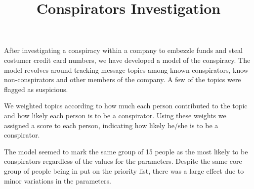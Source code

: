 \documentclass{icmmcm}
\title{Conspirators Investigation}
\begin{document}

\begin{summary}

After investigating a conspiracy within a company to embezzle funds and steal costumer credit card numbers, we have developed a model of the conspiracy.  The model revolves around tracking message topics among known conspirators, know non-conspirators and other members of the company.  A few of the topics were flagged as suspicious.

We weighted topics according to how much each person contributed to the topic and how likely each person is to be a conspirator.  Using these weights we assigned a score to each person, indicating how likely he/she is to be a conspirator. 

The model seemed to mark the same group of 15 people as the most likely to be conspirators regardless of the values for the parameters.  Despite the same core group of people being in put on the priority list, there was a large effect due to minor variations in the parameters.
\\\\


\end{summary}
\end{document}
